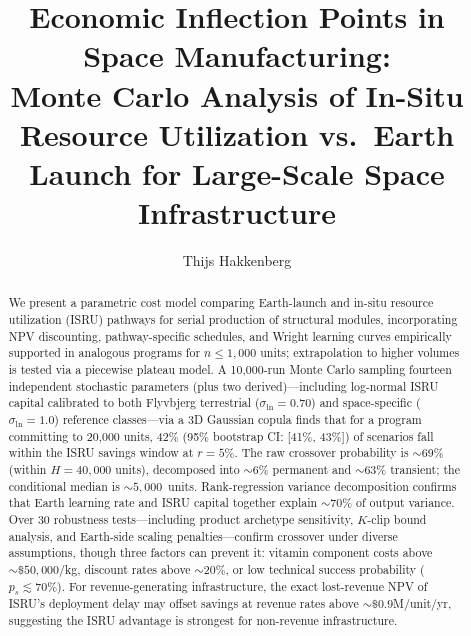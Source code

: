 \documentclass[preprint,12pt]{elsarticle}
\begin{document}
\begin{frontmatter}

\title{Economic Inflection Points in Space Manufacturing:\\ Monte Carlo Analysis of In-Situ Resource Utilization vs.\ Earth Launch for Large-Scale Space Infrastructure}

\author[dyson]{Thijs Hakkenberg}

\address[dyson]{Project Dyson, Open Research Initiative}

\begin{abstract}
We present a parametric cost model comparing Earth-launch and in-situ resource utilization (ISRU) pathways for serial production of structural modules, incorporating NPV discounting, pathway-specific schedules, and Wright learning curves empirically supported in analogous programs for $n \leq 1{,}000$ units; extrapolation to higher volumes is tested via a piecewise plateau model. A 10{,}000-run Monte Carlo sampling fourteen independent stochastic parameters (plus two derived)---including log-normal ISRU capital calibrated to both Flyvbjerg terrestrial ($\sigma_{\ln} = 0.70$) and space-specific ($\sigma_{\ln} = 1.0$) reference classes---via a 3D Gaussian copula finds that for a program committing to 20{,}000 units, 42\% (95\% bootstrap CI: [41\%, 43\%]) of scenarios fall within the ISRU savings window at $r = 5\%$. The raw crossover probability is ${\sim}$69\% (within $H = 40{,}000$ units), decomposed into ${\sim}$6\% permanent and ${\sim}$63\% transient; the conditional median is ${\sim}5{,}000$~units. Rank-regression variance decomposition confirms that Earth learning rate and ISRU capital together explain ${\sim}70\%$ of output variance. Over 30 robustness tests---including product archetype sensitivity, $K$-clip bound analysis, and Earth-side scaling penalties---confirm crossover under diverse assumptions, though three factors can prevent it: vitamin component costs above ${\sim}\$50{,}000$/kg, discount rates above ${\sim}20\%$, or low technical success probability ($p_s \lesssim 70\%$). For revenue-generating infrastructure, the exact lost-revenue NPV of ISRU's deployment delay may offset savings at revenue rates above ${\sim}\$0.9$M/unit/yr, suggesting the ISRU advantage is strongest for non-revenue infrastructure.
\end{abstract}


\end{frontmatter}
\end{document}
